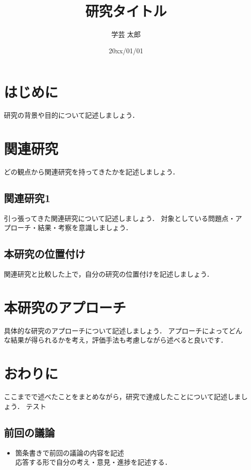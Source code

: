 \documentclass[dvipdfmx]{doc}
\title{研究タイトル} %
\affiliation{櫨山研究室}
\author{ 学芸 太郎} %
\date{20xx/01/01} %
\begin{document}
\maketitle

\section{はじめに}

研究の背景や目的について記述しましょう．

\section{関連研究}

どの観点から関連研究を持ってきたかを記述しましょう．

\subsection{関連研究1}

引っ張ってきた関連研究について記述しましょう．
対象としている問題点・アプローチ・結果・考察を意識しましょう．

\subsection{本研究の位置付け}

関連研究と比較した上で，自分の研究の位置付けを記述しましょう．

\section{本研究のアプローチ}

具体的な研究のアプローチについて記述しましょう．
アプローチによってどんな結果が得られるかを考え，評価手法も考慮しながら述べると良いです．

\section{おわりに}

ここまでで述べたことをまとめながら，研究で達成したことについて記述しましょう．
テスト

\begin{thebibliography}{10}
\end{thebibliography}

\subsection*{前回の議論}
\begin{itemize}
    \item 箇条書きで前回の議論の内容を記述 \\
    応答する形で自分の考え・意見・進捗を記述する．
\end{itemize}
\end{document}
